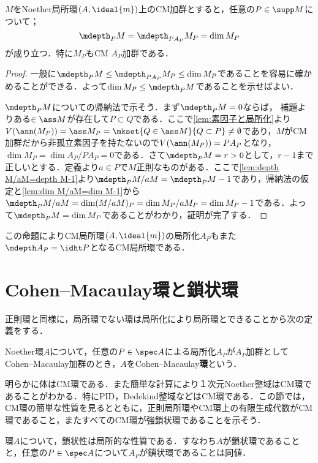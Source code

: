 \begin{prop}\label{prop:CMの局所化もCM}
	$M$をNoether局所環$(A,\ideal{m})$上のCM加群とすると，任意の$P\in\supp M$について；
	\[\mdepth_P M=\mdepth_{PA_P} M_P=\dim M_P\]
	が成り立つ．特に$M_P$もCM $A_P$加群である．
\end{prop}

\begin{proof}
	一般に$\mdepth_P M\leq\mdepth_{PA_P}M_P\leq\dim M_P$であることを容易に確かめることができる．よって$\dim M_P\leq\mdepth_P M$であることを示せばよい．
	
	$\mdepth_P M$についての帰納法で示そう．まず$\mdepth_P M=0$ならば，
	補題よりある$\in\ass M$が存在して$P\subset Q$である．ここで\ref{lem:素因子と局所化}より$V(\ann (M_P))=\ass M_P=\mkset{Q\in\ass M}{Q\subset P}\neq\emptyset$であり，$M$がCM加群だから非孤立素因子を持たないので$V(\ann(M_P))=PA_P$となり，$\dim M_P=\dim A_P/PA_P=0$である．さて$\mdepth_P M=r>0$として，$r-1$まで正しいとする．定義より$a\in P$で$M$正則なものがある．ここで\ref{lem:depth M/aM=depth M-1}より$\mdepth_P M/aM=\mdepth_P M-1$であり，帰納法の仮定と\ref{lem:dim M/aM=dim M-1}から$\mdepth_P M/aM=\dim (M/aM)_P=\dim M_P/aM_P=\dim M_P-1$である．よって$\mdepth_P M=\dim M_P$であることがわかり，証明が完了する．	
\end{proof}

この命題によりCM局所環$(A,\ideal{m})$の局所化$A_P$もまた$\mdepth A_P=\idht P$となるCM局所環である．
\section{Cohen--Macaulay環と鎖状環}

正則環と同様に，局所環でない環は局所化により局所環とできることから次の定義をする．
\begin{defi}
	Noether環$A$について，任意の$P\in\spec A$による局所化$A_P$が$A_P$加群としてCohen--Macaulay加群のとき，$A$をCohen--Macaulay\textbf{環}という．
\end{defi}

明らかに体はCM環である．また簡単な計算により１次元Noether整域はCM環であることがわかる．特にPID，Dedekind整域などはCM環である．この節では，CM環の簡単な性質を見るとともに，正則局所環やCM環上の有限生成代数がCM環であること，またすべてのCM環が強鎖状環であることを示そう．

\begin{prop}
	環$A$について，鎖状性は局所的な性質である．すなわち$A$が鎖状環であることと，任意の$P\in\spec A$について$A_P$が鎖状環であることは同値．
\end{prop}

